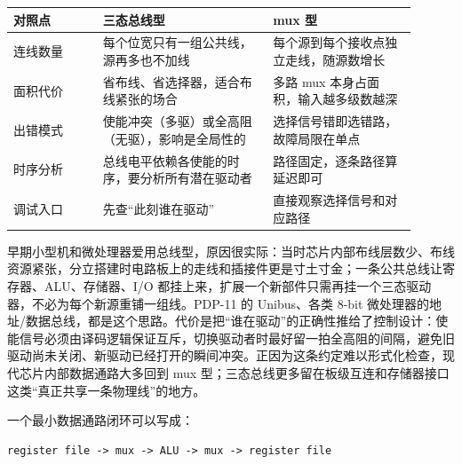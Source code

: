 \begin{longtable}{L{0.2\linewidth}L{0.38\linewidth}L{0.32\linewidth}}
\toprule
对照点 & 三态总线型 & mux 型 \\
\midrule
连线数量 & 每个位宽只有一组公共线，源再多也不加线 & 每个源到每个接收点独立走线，随源数增长 \\\tablerowrule
面积代价 & 省布线、省选择器，适合布线紧张的场合 & 多路 mux 本身占面积，输入越多级数越深 \\\tablerowrule
出错模式 & 使能冲突（多驱）或全高阻（无驱），影响是全局性的 & 选择信号错即选错路，故障局限在单点 \\\tablerowrule
时序分析 & 总线电平依赖各使能的时序，要分析所有潜在驱动者 & 路径固定，逐条路径算延迟即可 \\\tablerowrule
调试入口 & 先查“此刻谁在驱动” & 直接观察选择信号和对应路径 \\
\bottomrule
\end{longtable}

早期小型机和微处理器爱用总线型，原因很实际：当时芯片内部布线层数少、布线资源紧张，分立搭建时电路板上的走线和插接件更是寸土寸金；一条公共总线让寄存器、ALU、存储器、I/O 都挂上来，扩展一个新部件只需再挂一个三态驱动器，不必为每个新源重铺一组线。PDP-11 的 Unibus、各类 8-bit 微处理器的地址/数据总线，都是这个思路。代价是把“谁在驱动”的正确性推给了控制设计：使能信号必须由译码逻辑保证互斥，切换驱动者时最好留一拍全高阻的间隔，避免旧驱动尚未关闭、新驱动已经打开的瞬间冲突。正因为这条约定难以形式化检查，现代芯片内部数据通路大多回到 mux 型；三态总线更多留在板级互连和存储器接口这类“真正共享一条物理线”的地方。

一个最小数据通路闭环可以写成：

\begin{lstlisting}
register file -> mux -> ALU -> mux -> register file
\end{lstlisting}

